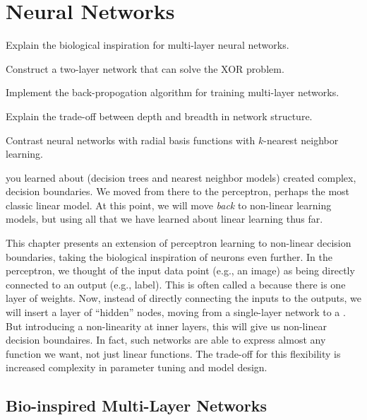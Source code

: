 \chapter{Neural Networks} \label{sec:nnet}


\begin{learningobjectives}
\item Explain the biological inspiration for multi-layer neural
  networks.
\item Construct a two-layer network that can solve the XOR problem.
\item Implement the back-propogation algorithm for training
  multi-layer networks.
\item Explain the trade-off between depth and breadth in network
  structure.
\item Contrast neural networks with radial basis functions with
  $k$-nearest neighbor learning.
\end{learningobjectives}

\dependencies{}

 you learned about (decision
trees and nearest neighbor models) created complex,
 decision boundaries.  We moved from there to the
perceptron, perhaps the most classic linear model.  At this point, we
will move \emph{back} to non-linear learning models, but using all
that we have learned about linear learning thus far.

This chapter presents an extension of perceptron learning to
non-linear decision boundaries, taking the biological inspiration of
neurons even further.  In the perceptron, we thought of the input data
point (e.g., an image) as being directly connected to an output (e.g.,
label).  This is often called a  because
there is one layer of weights.  Now, instead of directly connecting
the inputs to the outputs, we will insert a layer of ``hidden'' nodes,
moving from a single-layer network to a .
But introducing a non-linearity at inner layers, this will give us
non-linear decision boundaires.  In fact, such networks are able to
express almost any function we want, not just linear functions.  The
trade-off for this flexibility is increased complexity in parameter
tuning and model design.

\section{Bio-inspired Multi-Layer Networks}


